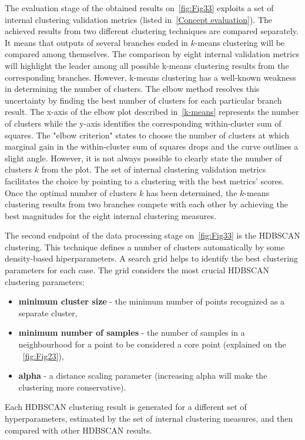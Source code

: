 The evaluation stage of the obtained results on~\autoref{fig:Fig33} exploits a set of internal clustering validation metrics (listed in~\ref{Concept evaluation}). The achieved results from two different clustering techniques are compared separately. It means that outputs of several branches ended in $k$-means clustering will be compared among themselves. The comparison by eight internal validation metrics will highlight the leader among all possible k-means clustering results from the corresponding branches. However, k-means clustering has a well-known weakness in determining the number of clusters. The elbow method resolves this uncertainty by finding the best number of clusters for each particular branch result. The x-axis of the elbow plot described in~\ref{k-means} represents the number of clusters while the y-axis identifies the corresponding within-cluster sum of squares. The "elbow criterion" states to choose the number of clusters at which marginal gain in the within-cluster sum of squares drops and the curve outlines a slight angle. However, it is not always possible to clearly state the number of clusters $k$ from the plot. The set of internal clustering validation metrics facilitates the choice by pointing to a clustering with the best metrics' scores. Once the optimal number of clusters $k$ has been determined, the $k$-means clustering results from two branches compete with each other by achieving the best magnitudes for the eight internal clustering measures.

The second endpoint of the data processing stage on~\autoref{fig:Fig33} is the HDBSCAN clustering. This technique defines a number of clusters automatically by some density-based hiperparameters. A search grid helps to identify the best clustering parameters for each case. The grid considers the most crucial HDBSCAN clustering parameters:
    \begin{itemize}
        \item \textbf{minimum cluster size} - the minimum number of points recognized as a separate cluster,
        \item \textbf{minimum number of samples} - the number of samples in a neighbourhood for a point to be considered a core point (explained on the ~\autoref{fig:Fig23}),
        \item \textbf{alpha} - a distance scaling parameter (increasing alpha will make the clustering more conservative).
    \end{itemize}
Each HDBSCAN clustering result is generated for a different set of hyperparameters, estimated by the set of internal clustering measures, and then compared with other HDBSCAN results.

